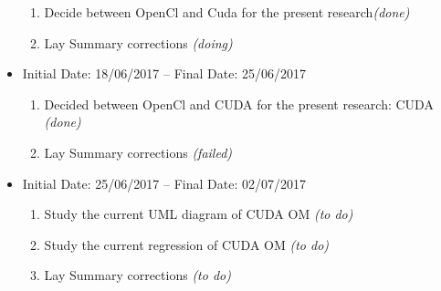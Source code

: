 \documentclass[11pt]{article}
\begin{document}
\begin{itemize}
\begin{enumerate}
				\item Decide between OpenCl and Cuda for the present research{\it (done)}
				\item Lay Summary corrections {\it (doing)}
			\end{enumerate}
			\item Initial Date: 18/06/2017 -- Final Date: 25/06/2017
			\begin{enumerate}
				\item Decided between OpenCl and CUDA for the present research: CUDA {\it (done)}
				\item Lay Summary corrections {\it (failed)}
			\end {enumerate}
			\item Initial Date: 25/06/2017 -- Final Date: 02/07/2017
			\begin{enumerate}
				\item Study the current UML diagram of CUDA OM {\it (to do)}
				\item Study the current regression of CUDA OM {\it (to do)}
				\item Lay Summary corrections {\it (to do)}
			\end {enumerate}

\end{itemize}
\end{document}

